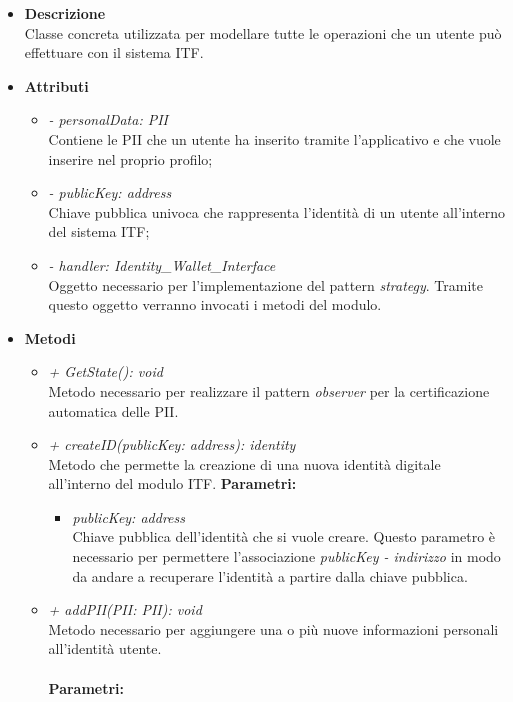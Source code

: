 \begin{itemize}
	\item \textbf{Descrizione}\\
	Classe concreta utilizzata per modellare tutte le operazioni che un utente può effettuare con il sistema \gls{ITF}.
	\item \textbf{Attributi}
	\begin{itemize}
		\item \textit{- personalData: PII}\\
		Contiene le \gls{PII} che un utente ha inserito tramite l'applicativo e che vuole inserire nel proprio profilo;
		\item \textit{- publicKey: address}\\
		Chiave pubblica univoca che rappresenta l'identità di un utente all'interno del sistema \gls{ITF};
		\item \textit{- handler: Identity\_Wallet\_Interface}\\
		Oggetto necessario per l'implementazione del pattern \textit{strategy}. Tramite questo oggetto verranno invocati i metodi del modulo.
	\end{itemize}
	\item \textbf{Metodi}
	\begin{itemize}
		\item \textit{+ GetState(): void}\\
		Metodo necessario per realizzare il pattern \textit{observer} per la certificazione automatica delle \gls{PII}.
		\item \textit{+ createID(publicKey: address): identity}\\
		Metodo che permette la creazione di una nuova identità digitale all'interno del modulo \gls{ITF}.
		\textbf{Parametri:}
		\begin{itemize}
			\item \textit{publicKey: address}\\
			Chiave pubblica dell'identità che si vuole creare. Questo parametro è necessario per permettere l'associazione \textit{publicKey - indirizzo} in modo da andare a recuperare l'identità a partire dalla chiave pubblica.
		\end{itemize}
		\item \textit{+ addPII(PII: PII): void}\\
		Metodo necessario per aggiungere una o più nuove informazioni personali all'identità utente.\\\\
		\textbf{Parametri:}
		\begin{itemize}

\end{itemize}
\end{itemize}
\end{itemize}
